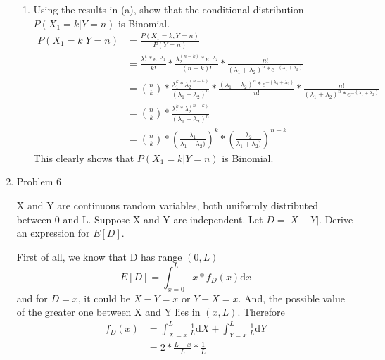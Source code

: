 \documentclass[letterpaper]{article}
\begin{document}
\begin{enumerate}
\begin{enumerate}
\item{}  Using the results in (a), show that the conditional distribution $P(X_1 = k | Y = n)$ is Binomial.
\begin{equation}
\begin{split}
P(X_1 = k | Y = n) &= \frac{P(X_1 = k, Y = n)}{P(Y = n)}\\
           &= \frac{\lambda_1^k * e^{-\lambda_1}}{k!} * \frac{\lambda_2^{(n - k)} * e^{-\lambda_2}}{(n - k)!} * \frac{n!}{(\lambda_1 + \lambda_2)^n * e^{-(\lambda_1 + \lambda_2)}}\\
           &= {n \choose k} * \frac{\lambda_1^k * \lambda_2^{(n - k)}}{(\lambda_1 + \lambda_2)^n} * \frac{(\lambda_1 + \lambda_2)^n * e^{-(\lambda_1 + \lambda_2)}}{n!} * \frac{n!}{(\lambda_1 + \lambda_2)^n * e^{-(\lambda_1 + \lambda_2)}}\\
           &= {n \choose k} * \frac{\lambda_1^k * \lambda_2^{(n - k)}}{(\lambda_1 + \lambda_2)^n}\\
           &= {n \choose k} * (\frac{\lambda_1}{\lambda_1 + \lambda_2)})^k * (\frac{\lambda_2}{\lambda_1 + \lambda_2)})^{n-k}
\end{split}
\end{equation}
This clearly shows that $P(X_1 = k | Y = n)$ is Binomial.

\end{enumerate}
\medskip
\newpage

\item{Problem 6}
\begin{mdframed}
X and Y are continuous random variables, both uniformly distributed between 0 and L. Suppose X and Y are independent. Let $D = \left| X - Y \right|$. Derive an expression for $E[D]$.
\end{mdframed}

First of all, we know that D has range $(0, L)$
\begin{equation}
E[D] = \int_{x=0}^{L}{x * f_D(x) \mathrm{d}x}
\end{equation}
and for $D = x$, it could be $X - Y = x$ or $Y - X = x$. And, the possible value of the greater one between X and Y lies in $(x, L)$. Therefore
\begin{equation}
\begin{split}
f_D(x) &= \int_{X=x}^{L}{\frac{1}{L} \mathrm{d}X} + \int_{Y=x}^{L}{\frac{1}{L} \mathrm{d}Y}\\
          & = 2 * \frac{L - x}{L} * \frac{1}{L}
\end{split}
\end{equation}


\end{enumerate}
\end{document}
